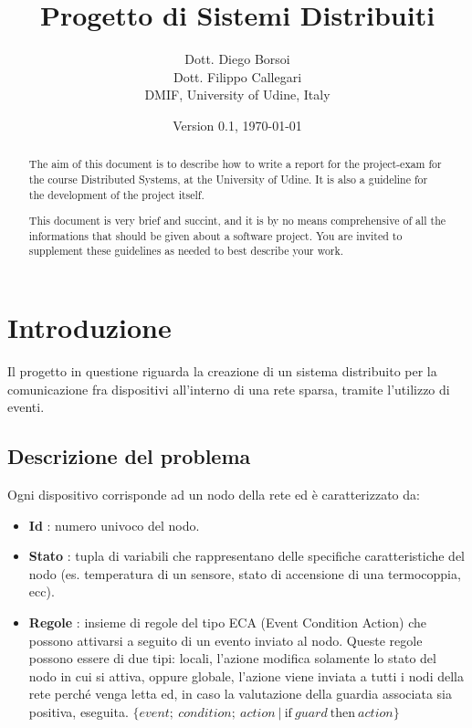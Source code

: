 \documentclass{memoir}
\title{Progetto di Sistemi Distribuiti}
\author{Dott. Diego Borsoi\\Dott. Filippo Callegari\\ DMIF, University of Udine, Italy}
\date{Version 0.1, \today}
\begin{document}
\maketitle
\begin{abstract}
The aim of this document is to describe how to write a report for the project-exam for the course Distributed Systems, at the University of Udine.
It is also a guideline for the development of the project itself.

This document is very brief and succint, and it is by no means comprehensive of all the informations that should be given about a software project. You are invited to supplement these guidelines as needed to best describe your work.
\end{abstract}

\chapter{Introduzione}\label{ch:intro}

Il progetto in questione riguarda la creazione di un sistema distribuito per la comunicazione fra dispositivi all'interno di una rete sparsa, tramite l'utilizzo di eventi.

\section{Descrizione del problema}

Ogni dispositivo corrisponde ad un nodo della rete ed è caratterizzato da:
\begin{itemize}
\item \textbf{Id} : numero univoco del nodo.
\item \textbf{Stato} : tupla di variabili che rappresentano delle specifiche caratteristiche del nodo (es. temperatura di un sensore, stato di accensione di una termocoppia, ecc).
\item \textbf{Regole} : insieme di regole del tipo ECA (Event Condition Action) che possono attivarsi a seguito di un evento inviato al nodo. Queste regole possono essere di due tipi: locali, l'azione modifica solamente lo stato del nodo in cui si attiva, oppure globale, l'azione viene inviata a tutti i nodi della rete perché venga letta ed, in caso la valutazione della guardia associata sia positiva, eseguita.
\center$\{event;~condition;~action~|~\text{if}~guard~\text{then}~action\}$
\end{itemize}
\end{document}
